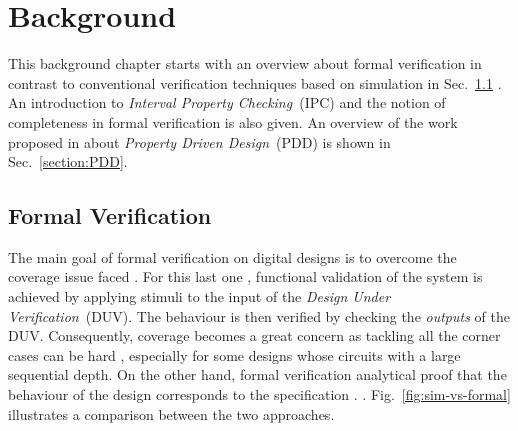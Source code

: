 \chapter{Background}

This background chapter starts with an overview about formal verification in contrast to conventional verification techniques based on simulation in Sec.~\ref{section:formal-verification} . An introduction to \textit{Interval Property Checking}~(IPC) and the notion of completeness in formal verification is also given. An overview of the work proposed in \cite{paper-pdd} about \textit{Property Driven Design}~(PDD) is shown in Sec.~\ref{section:PDD}.


\section{Formal Verification}
\label{section:formal-verification}

The main goal of formal verification on digital designs is to overcome the coverage issue faced . For this last one , functional validation of the system is achieved by applying stimuli to the input of the \textit{Design Under Verification}~(DUV). The behaviour is then verified by checking the \textit{outputs} of the DUV.  Consequently, coverage becomes a great  concern as tackling  all the corner cases can be hard , especially for some designs whose  circuits with a large sequential depth. On the other hand, formal verification  analytical proof that the behaviour of the design corresponds to the specification . \cite{thesis-formal}. Fig.~\ref{fig:sim-vs-formal} illustrates a comparison between the two approaches.


